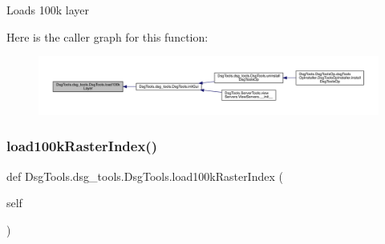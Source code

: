 \begin{DoxyVerb}Loads 100k layer
\end{DoxyVerb}
 Here is the caller graph for this function\+:
\nopagebreak
\begin{figure}[H]
\begin{center}
\leavevmode
\includegraphics[width=350pt]{class_dsg_tools_1_1dsg__tools_1_1_dsg_tools_a9d7bc8c97b5ed7c1758e25a4cf6695ec_icgraph}
\end{center}
\end{figure}
\mbox{\label{class_dsg_tools_1_1dsg__tools_1_1_dsg_tools_a4ad69ff13c195868a4f0d8621dbbc60b}} 
\subsubsection{\texorpdfstring{load100k\+Raster\+Index()}{load100kRasterIndex()}}
{\footnotesize\ttfamily def Dsg\+Tools.\+dsg\+\_\+tools.\+Dsg\+Tools.\+load100k\+Raster\+Index (\begin{DoxyParamCaption}\item[{}]{self }\end{DoxyParamCaption})}

